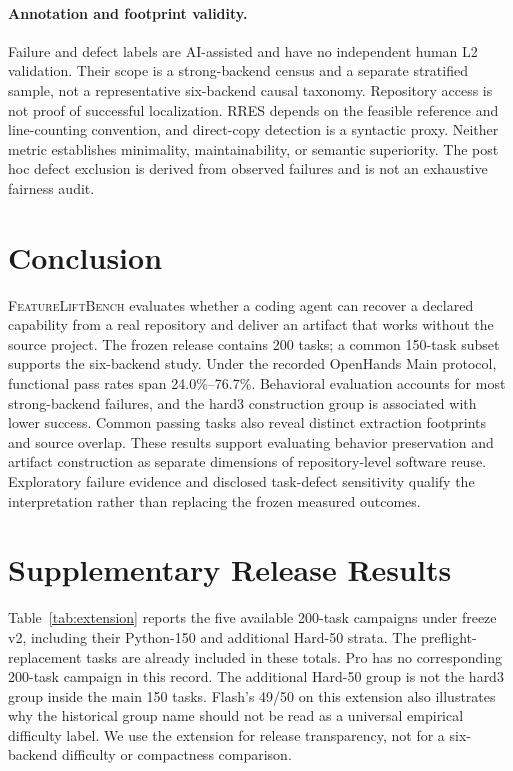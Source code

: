 \documentclass[acmsmall,screen,review,anonymous]{acmart}
\newcommand{\flb}{\textsc{FeatureLiftBench}\xspace}
\begin{document}
\paragraph{Annotation and footprint validity.}
Failure and defect labels are AI-assisted and have no independent human L2
validation. Their scope is a strong-backend census and a separate stratified
sample, not a representative six-backend causal taxonomy. Repository access is
not proof of successful localization. RRES depends on the feasible reference
and line-counting convention, and direct-copy detection is a syntactic proxy.
Neither metric establishes minimality, maintainability, or semantic superiority.
The post hoc defect exclusion is derived from observed failures and is not an
exhaustive fairness audit.

\section{Conclusion}

\flb evaluates whether a coding agent can recover a declared capability from a
real repository and deliver an artifact that works without the source project.
The frozen release contains 200 tasks; a common 150-task subset supports the
six-backend study. Under the recorded OpenHands Main protocol, functional pass
rates span 24.0\%--76.7\%. Behavioral evaluation accounts for most strong-backend
failures, and the hard3 construction group is associated with lower success.
Common passing tasks also reveal distinct extraction footprints and source
overlap. These results support evaluating behavior preservation and artifact
construction as separate dimensions of repository-level software reuse.
Exploratory failure evidence and disclosed task-defect sensitivity qualify the
interpretation rather than replacing the frozen measured outcomes.

\FloatBarrier


\FloatBarrier
\appendix

\section{Supplementary Release Results}
\label{app:extension}

Table~\ref{tab:extension} reports the five available 200-task campaigns under
freeze v2, including their Python-150 and additional Hard-50 strata. The
preflight-replacement tasks are already included in these totals. Pro has no
corresponding 200-task campaign in this record. The additional Hard-50 group is
not the hard3 group inside the main 150 tasks. Flash's 49/50 on this extension
also illustrates why the historical group name should not be read as a universal
empirical difficulty label. We use the extension for release transparency,
not for a six-backend difficulty or compactness comparison.
\end{document}
